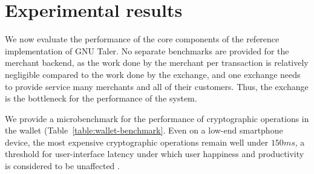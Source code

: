 \clearpage
\section{Experimental results}
We now evaluate the performance of the core components of the reference
implementation of GNU Taler.  No separate benchmarks are provided for the
merchant backend, as the work done by the merchant per transaction is
relatively negligible compared to the work done by the exchange, and one exchange needs
to provide service many merchants and all of their customers.  Thus, the exchange
is the bottleneck for the performance of the system.

We provide a microbenchmark for the performance of cryptographic operations in
the wallet (Table~\ref{table:wallet-benchmark}.  Even on a low-end smartphone
device, the most expensive cryptographic operations remain well under
$150ms$, a threshold for user-interface latency under which user happiness and
productivity is considered to be unaffected \cite{tolia2006quantifying}.

